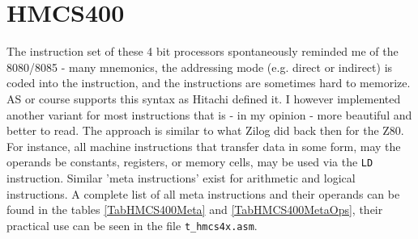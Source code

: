 \documentclass[12pt,twoside]{report}
\newcommand{\tty}[1]{{\tt #1}}
\begin{document}

\section{HMCS400}

The instruction set of these 4 bit processors spontaneously reminded
me of the 8080/8085 - many mnemonics, the addressing mode (e.g.
direct or indirect) is coded into the instruction, and the
instructions are sometimes hard to memorize.  AS or course
supports this syntax as Hitachi defined it.  I however
implemented another variant for most instructions that is - in my
opinion - more beautiful and better to read.  The approach is
similar to what Zilog did back then for the Z80.  For instance,
all machine instructions that transfer data in some form, may the
operands be constants, registers, or memory cells, may be used
via the \tty{LD} instruction.  Similar 'meta instructions' exist
for arithmetic and logical instructions.  A complete list of all
meta instructions and their operands can be found in the tables
\ref{TabHMCS400Meta} and \ref{TabHMCS400MetaOps}, their practical
use can be seen in the file \tty{t\_hmcs4x.asm}.
\end{document}
